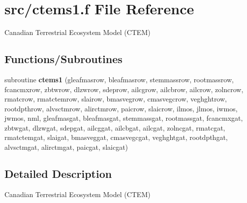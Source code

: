 \hypertarget{ctems1_8f}{}\section{src/ctems1.f File Reference}
\label{ctems1_8f}


Canadian Terrestrial Ecosystem Model (C\+T\+E\+M)  


\subsection*{Functions/\+Subroutines}
\begin{DoxyCompactItemize}
\item 
\hypertarget{ctems1_8f_ac687fbca2d67c053bdf020766a399b40}{}subroutine {\bfseries ctems1} (gleafmasrow, bleafmasrow, stemmassrow, rootmassrow, fcancmxrow, zbtwrow, dlzwrow, sdeprow, ailcgrow, ailcbrow, ailcrow, zolncrow, rmatcrow, rmatctemrow, slairow, bmasvegrow, cmasvegcrow, veghghtrow, rootdpthrow, alvsctmrow, alirctmrow, paicrow, slaicrow, ilmos, jlmos, iwmos, jwmos, nml, gleafmasgat, bleafmasgat, stemmassgat, rootmassgat, fcancmxgat, zbtwgat, dlzwgat, sdepgat, ailcggat, ailcbgat, ailcgat, zolncgat, rmatcgat, rmatctemgat, slaigat, bmasveggat, cmasvegcgat, veghghtgat, rootdpthgat, alvsctmgat, alirctmgat, paicgat, slaicgat)\label{ctems1_8f_ac687fbca2d67c053bdf020766a399b40}

\end{DoxyCompactItemize}


\subsection{Detailed Description}
Canadian Terrestrial Ecosystem Model (C\+T\+E\+M) 

